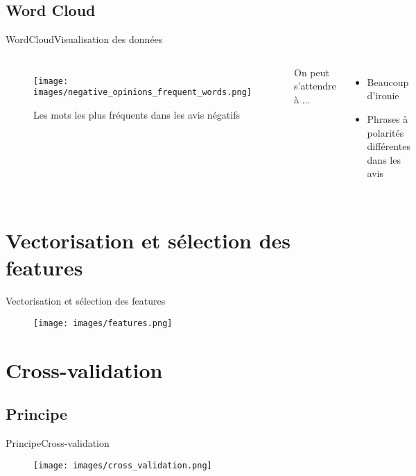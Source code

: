 \documentclass[usenames,dvipsnames]{beamer}
\begin{document}
\subsection{Word Cloud}
\begin{frame}{WordCloud}{Visualisation des données}
\begin{columns}
\begin{figure}[!ht]
    \centering
    \texttt{[image: images/negative\_opinions\_frequent\_words.png]}
    \caption{Les mots les plus fréquents dans les avis négatifs}
\end{figure}
On peut s'attendre à $\dots$
\begin{itemize}
    \item Beaucoup d'ironie
    \item Phrases à polarités différentes dans les avis
\end{itemize}
\end{columns}
\end{frame}

\section{Vectorisation et sélection des features}
\begin{frame}{Vectorisation et sélection des features}
\begin{figure}[!ht]
    \centering
    \texttt{[image: images/features.png]}
\end{figure}
\end{frame}

\section{Cross-validation}
\subsection{Principe}
\begin{frame}{Principe}{Cross-validation}
\begin{figure}[!ht]
  \centering
  \texttt{[image: images/cross\_validation.png]}
\end{figure}
\end{frame}
\end{document}

